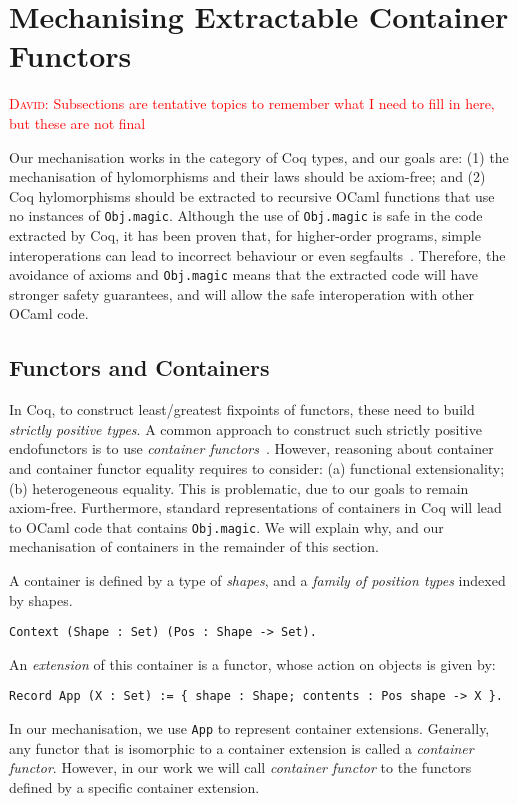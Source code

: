 \documentclass[a4paper, UKenglish, cleveref, autoref, thm-restate]{lipics-v2021}
\newcommand{\dcas}[1]{\textcolor{red}{\textsc{David}: #1}}
\begin{document}
\section{Mechanising Extractable Container Functors}

\dcas{Subsections are tentative topics to remember what I need to fill in here,
but these are not final}

Our mechanisation works in the category of Coq types, and our goals are: (1)
the mechanisation of hylomorphisms and their laws should be axiom-free; and (2)
Coq hylomorphisms should be extracted to recursive OCaml functions that use no
instances of \texttt{Obj.magic}.  Although the use of
\texttt{Obj.magic} is safe in the code extracted by Coq, it has been
proven that, for higher-order programs, simple interoperations can lead to
incorrect behaviour or even segfaults~\cite{forster:hal-04329663}.  Therefore,
the avoidance of axioms and  \texttt{Obj.magic} means that the
extracted code will have stronger safety guarantees, and will allow the safe
interoperation with other OCaml code.

\subsection{Functors and Containers}

In Coq, to construct least/greatest fixpoints of functors, these need to build
\emph{strictly positive types}. A common approach to construct such strictly
positive endofunctors is to use \emph{container functors}~\cite{Whatever}.
However, reasoning about container and container functor equality requires to
consider: (a) functional extensionality; (b) heterogeneous equality. This is
problematic, due to our goals to remain axiom-free. Furthermore, standard
representations of containers in Coq will lead to OCaml code that contains
\texttt{Obj.magic}. We will explain why, and our mechanisation of
containers in the remainder of this section.

A container is defined by a type of \emph{shapes}, and a \emph{family of
position types} indexed by shapes. 
\begin{verbatim}
Context (Shape : Set) (Pos : Shape -> Set).
\end{verbatim}
An \emph{extension} of this container is a functor,
whose action on objects is given by:
\begin{verbatim}
Record App (X : Set) := { shape : Shape; contents : Pos shape -> X }.
\end{verbatim}
In our mechanisation, we use \texttt{App} to represent container
extensions.  Generally, any functor that is isomorphic to a container extension
is called a \emph{container functor}. However, in our work we will call
\emph{container functor} to the functors defined by a specific container
extension.
\end{document}

